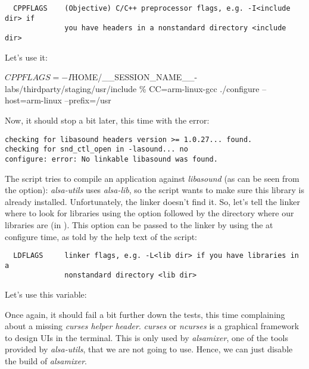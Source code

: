 \begin{verbatim}
  CPPFLAGS    (Objective) C/C++ preprocessor flags, e.g. -I<include dir> if
              you have headers in a nonstandard directory <include dir>
\end{verbatim}

Let's use it:

\begin{bashinput}
$ CPPFLAGS=-I$HOME/__SESSION_NAME__-labs/thirdparty/staging/usr/include \%\linebreak
CC=arm-linux-gcc %
./configure --host=arm-linux --prefix=/usr
\end{bashinput}

Now, it should stop a bit later, this time with the error:
\begin{verbatim}
checking for libasound headers version >= 1.0.27... found.
checking for snd_ctl_open in -lasound... no
configure: error: No linkable libasound was found.
\end{verbatim}

The  script tries to compile an application against {\em
  libasound} (as can be seen from the  option): {\em
  alsa-utils} uses {\em alsa-lib}, so the  script
wants to make sure this library is already installed. Unfortunately,
the  linker doesn't find it. So, let's tell the
linker where to look for libraries using the  option followed
by the directory where our libraries are (in
). This  option can be passed to the
linker by using the  at configure time, as told by the
help text of the  script:

\begin{verbatim}
  LDFLAGS     linker flags, e.g. -L<lib dir> if you have libraries in a
              nonstandard directory <lib dir>
\end{verbatim}

Let's use this  variable:


Once again, it should fail a bit further down the tests, this time
complaining about a missing {\em curses helper header}. {\em curses}
or {\em ncurses} is a graphical framework to design UIs in the
terminal. This is only used by {\em alsamixer}, one of the tools
provided by {\em alsa-utils}, that we are not going to use.
Hence, we can just disable the build of {\em alsamixer}.

